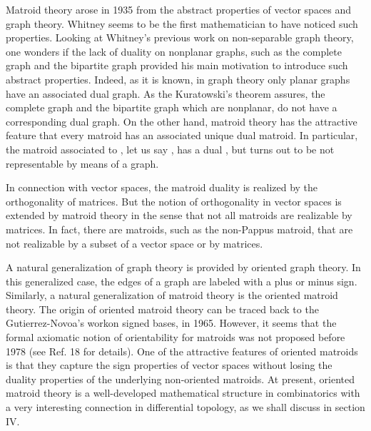 \documentclass[a4paper,12pt]{article}
\begin{document}
Matroid theory\coordHE{} arose in 1935 from the abstract properties of vector
spaces and graph theory. Whitney\coordHE{} seems to be the first mathematician
to have noticed such properties. Looking at Whitney's previous work\coordHE{}
on non-separable graph theory, one wonders if the lack of duality on
nonplanar graphs, such as the complete graph \coordHE{} and the bipartite graph 
\coordHE{} provided his main motivation to introduce such abstract
properties. Indeed, as it is known, in graph theory only planar graphs have
an associated dual graph. As the Kuratowski's theorem assures, the complete
graph \coordHE{} and the bipartite graph \coordHE{} which are nonplanar, do not
have a corresponding dual graph. On the other hand, matroid theory has the
attractive feature that every matroid has an associated unique dual matroid.
In particular, the matroid associated to \coordHE{}, let us say \coordHE{}, has
a dual \coordHE{}, but \coordHE{} turns out to be not
representable by means of a graph.

In connection with vector spaces, the matroid duality is realized by the
orthogonality of matrices. But the notion of orthogonality in vector spaces
is extended by matroid theory in the sense that not all matroids are
realizable by matrices. In fact, there are matroids, such as the non-Pappus
matroid,\coordHE{} that are not realizable by a subset of a vector space or by
matrices.

A natural generalization of graph theory is provided by oriented graph
theory. In this generalized case, the edges of a graph are labeled with a
plus or minus sign. Similarly, a natural generalization of matroid theory is
the oriented matroid theory. The origin of oriented matroid theory can be
traced back to the Gutierrez-Novoa's work\coordHE{}on signed bases, in 1965.
However, it seems that the formal axiomatic notion of orientability for
matroids was not proposed before 1978 (see Ref. 18 for details). One of the
attractive features of oriented matroids is that they capture the sign
properties of vector spaces without losing the duality properties of the
underlying non-oriented matroids. At present, oriented matroid theory is a
well-developed mathematical structure in combinatorics with a very
interesting connection in differential topology, as we shall discuss in
section IV.
\end{document}
